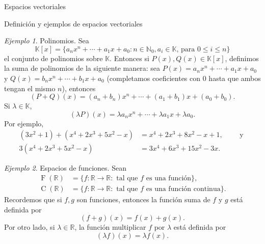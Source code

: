 \documentclass[a4paper,12pt,twoside,spanish,reqno]{amsbook}
\numberwithin{equation}{section}
\theoremstyle{definition}
\theoremstyle{remark}
\newtheorem*{ejemplo*}{Ejemplo}
\newcommand{\R}{\mathbb R}
\newcommand{\K}{\mathbb K}
\begin{document}
\begin{chapter}{Espacios vectoriales}
\begin{section}{Definición y ejemplos de espacios vectoriales}
            \begin{ejemplo*}{\sc Polinomios.} Sea 
                \begin{equation*}
                \K[x] = \{a_nx^n + \cdots + a_1x + a_0: n \in \mathbb N_0, a_i \in \K\text{, para } 0\le i \le n  \}
                \end{equation*}
                el conjunto de polinomios sobre $\K$. Entonces si $P(x), Q(x) \in \K[x]$, definimos la suma de polinomios de la siguiente manera: sea $P(x) = a_nx^n + \cdots + a_1x + a_0$ y $Q(x)= b_nx^n + \cdots + b_1x + a_0$ (completamos coeficientes con 0 hasta que ambos tengan el mismo $n$), entonces
                \begin{equation*}
                (P+Q)(x) = (a_n+b_n)x^n + \cdots + (a_1+ b_1)x + (a_0+b_0).
                \end{equation*}
                Si $\lambda \in \K$, 
                \begin{equation*}
                (\lambda P)(x) = \lambda a_nx^n + \cdots + \lambda a_1x + \lambda a_0.
                \end{equation*}
                Por ejemplo,
                \begin{align*}
                (3x^2 + 1)+(x^4 + 2x^3 + 5x^2-x) &= x^4 + 2x^3 + 8x^2-x +1, \qquad \text{ y } \\
                3(x^4 + 2x^3 + 5x^2-x) &= 3x^4 + 6x^3 + 15x^2-3x.
                \end{align*}
            \end{ejemplo*}
            
            
            \medspace
            
            \begin{ejemplo*}{\sc Espacios de funciones.} Sean
                \begin{align*}
                \operatorname{F}(\R) &= \{f: \R \to \R: \text{ tal que } f \text{ es una función} \},\\
                \operatorname{C}(\R) &= \{f: \R \to \R: \text{ tal que }  f  \text{ es una función continua} \}.
                \end{align*}
                Recordemos que si $f,g$ son funciones, entonces la función suma de $f$ y $g$ está definida por
                \begin{equation*}
                (f+g)(x) = f(x) + g(x).
                \end{equation*}
                Por otro lado, si $\lambda \in \R$, la función multiplicar $f$ por $\lambda $ está definida por
                \begin{equation*}
                (\lambda f)(x) = \lambda f(x).
                \end{equation*}			
                                

\end{ejemplo*}
\end{section}
\end{chapter}
\end{document}
